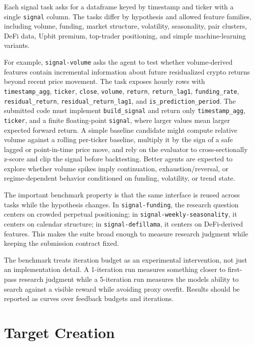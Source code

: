 \documentclass[
]{article}
\begin{document}
Each signal task asks for a dataframe keyed by timestamp and ticker with a single \texttt{signal} column. The tasks differ by hypothesis and allowed feature families, including volume, funding, market structure, volatility, seasonality, pair clusters, DeFi data, Upbit premium, top-trader positioning, and simple machine-learning variants.

For example, \texttt{signal-volume} asks the agent to test whether volume-derived features contain incremental information about future residualized crypto returns beyond recent price movement. The task exposes hourly rows with \texttt{timestamp\_agg}, \texttt{ticker}, \texttt{close}, \texttt{volume}, \texttt{return}, \texttt{return\_lag1}, \texttt{funding\_rate}, \texttt{residual\_return}, \texttt{residual\_return\_lag1}, and \texttt{is\_prediction\_period}. The submitted code must implement \texttt{build\_signal} and return only \texttt{timestamp\_agg}, \texttt{ticker}, and a finite floating-point \texttt{signal}, where larger values mean larger expected forward return. A simple baseline candidate might compute relative volume against a rolling per-ticker baseline, multiply it by the sign of a safe lagged or point-in-time price move, and rely on the evaluator to cross-sectionally z-score and clip the signal before backtesting. Better agents are expected to explore whether volume spikes imply continuation, exhaustion/reversal, or regime-dependent behavior conditioned on funding, volatility, or trend state.

The important benchmark property is that the same interface is reused across tasks while the hypothesis changes. In \texttt{signal-funding}, the research question centers on crowded perpetual positioning; in \texttt{signal-weekly-seasonality}, it centers on calendar structure; in \texttt{signal-defillama}, it centers on DeFi-derived features. This makes the suite broad enough to measure research judgment while keeping the submission contract fixed.

The benchmark treats iteration budget as an experimental intervention, not just an implementation detail. A 1-iteration run measures something closer to first-pass research judgment while a 5-iteration run measures the model\textquotesingle s ability to search against a visible reward while avoiding proxy overfit. Results should be reported as curves over feedback budgets and iterations.

\section{Target Creation}\label{target-creation}
\end{document}
